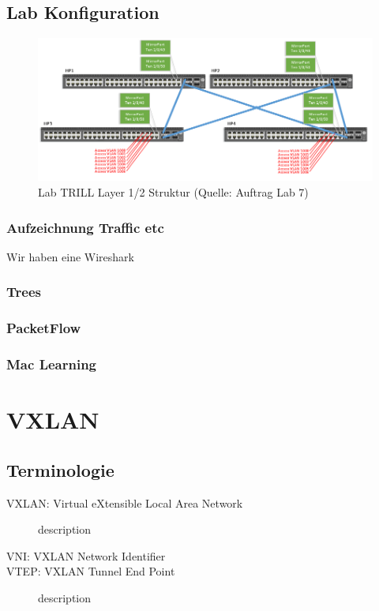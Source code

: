 \subsection{Lab Konfiguration}
\begin{figure}[h]
	\centering
	\includegraphics[width=1\linewidth]{trill_network_layer2}
	\caption{Lab TRILL Layer 1/2 Struktur (Quelle: Auftrag Lab 7)}
	\label{fig:trillnetworklayer2}
\end{figure}

\subsubsection{Aufzeichnung Traffic etc}

Wir haben eine Wireshark

\subsubsection{Trees}




\subsubsection{PacketFlow}

\subsubsection{Mac Learning}



\section{VXLAN}
\subsection{Terminologie}
\begin{description}
	\item[VXLAN: Virtual eXtensible Local Area Network] description
	\item[VNI: VXLAN Network Identifier] 
	\item[VTEP: VXLAN Tunnel End Point] description 

\end{description}

